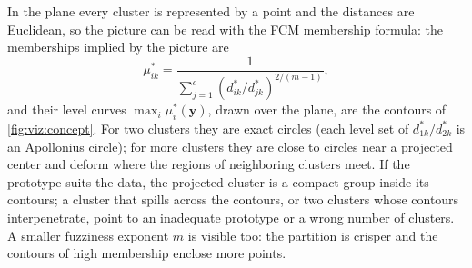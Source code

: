 In the plane every cluster is represented by a point and the distances are Euclidean, so the picture can be read with the FCM membership formula: the memberships implied by the picture are
\begin{equation}
  \mu^*_{ik} = \frac{1}{\sum_{j=1}^{c}\left(d^*_{ik}/d^*_{jk}\right)^{2/(m-1)}},
  \label{eq:viz:mustar}
\end{equation}
and their level curves $\max_i\mu^*_i(\mathbf{y})$, drawn over the plane, are the contours of \cref{fig:viz:concept}. For two clusters they are exact circles (each level set of $d^*_{1k}/d^*_{2k}$ is an Apollonius circle); for more clusters they are close to circles near a projected center and deform where the regions of neighboring clusters meet. If the prototype suits the data, the projected cluster is a compact group inside its contours; a cluster that spills across the contours, or two clusters whose contours interpenetrate, point to an inadequate prototype or a wrong number of clusters. A smaller fuzziness exponent $m$ is visible too: the partition is crisper and the contours of high membership enclose more points.

